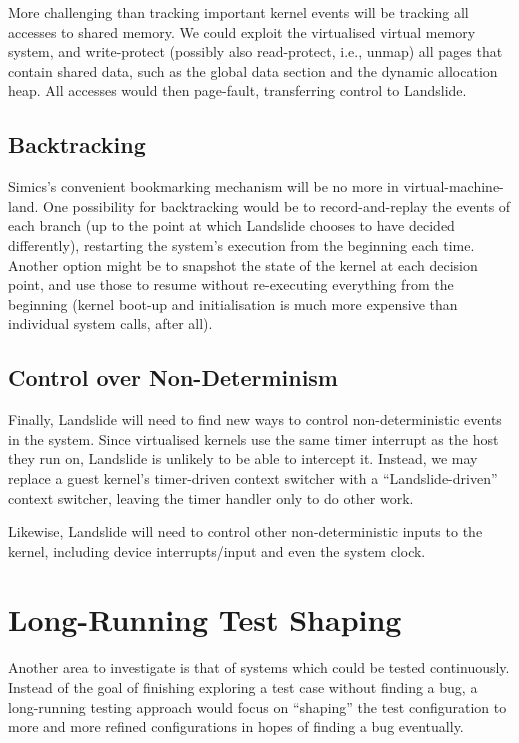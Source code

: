 More challenging than tracking important kernel events will be tracking all accesses to shared memory. We could exploit the virtualised virtual memory system, and write-protect (possibly also read-protect, i.e., unmap) all pages that contain shared data, such as the global data section and the dynamic allocation heap. All accesses would then page-fault, transferring control to Landslide.

\subsection{Backtracking}

Simics's convenient bookmarking mechanism will be no more in virtual-machine-land. One possibility for backtracking would be to record-and-replay the events of each branch (up to the point at which Landslide chooses to have decided differently), restarting the system's execution from the beginning each time. Another option might be to snapshot the state of the kernel at each decision point, and use those to resume without re-executing everything from the beginning (kernel boot-up and initialisation is much more expensive than individual system calls, after all).

\subsection{Control over Non-Determinism}

Finally, Landslide will need to find new ways to control non-deterministic events in the system. Since virtualised kernels use the same timer interrupt as the host they run on, Landslide is unlikely to be able to intercept it. Instead, we may replace a guest kernel's timer-driven context switcher with a ``Landslide-driven'' context switcher, leaving the timer handler only to do other work.

Likewise, Landslide will need to control other non-deterministic inputs to the kernel, including device interrupts/input and even the system clock.

\section{Long-Running Test Shaping}
\label{sec:future-shaping}

Another area to investigate is that of systems which could be tested continuously. Instead of the goal of finishing exploring a test case without finding a bug, a long-running testing approach would focus on ``shaping'' the test configuration to more and more refined configurations in hopes of finding a bug eventually.

